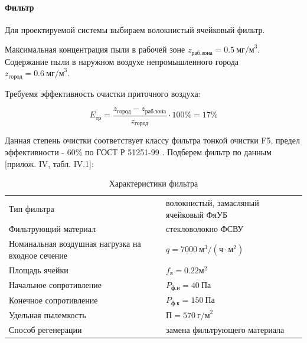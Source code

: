 \paragraph{Фильтр}
Для проектируемой системы выбираем волокнистый ячейковый фильтр.

Максимальная концентрация пыли в рабочей зоне $z_\text{раб.зона} = 0.5 ~\text{мг/м}^3$.
Содержание пыли в наружном воздухе непромышленного города $z_\text{город} = 0.6 ~\text{мг/м}^3$.

Требуемя эффективность очистки приточного воздуха:

$$
    E_\text{тр} = \frac{z_\text{город} - z_\text{раб.зона}}{z_\text{город}} \cdot 100 \% = 17 \%
$$

Данная степень очистки соответствует классу фильтра тонкой очистки F5, предел
эффективности - 60\% по ГОСТ Р 51251-99 \cite{ecology_gost_51251_99}.
Подберем фильтр по данным \cite{air_ventilation_and_conditioning}[прилож. IV, табл. IV.1]:

\begin{table}[ht]
    \centering
    \begin{tabu}{X[l,m]|X[l,m]}
        \hline
        Тип фильтра                                         & волокнистый, замасляный ячейковый ФяУБ            \\
        Фильтрующий материал                                & стекловолокно ФСВУ                                \\
        Номинальная воздушная нагрузка на входное сечение   & $q = 7000 ~\text{м}^3/(\text{ч} \cdot \text{м}^2)$\\
        Площадь ячейки                                      & $f_\text{я} = 0.22 \text{м}^2 $                   \\
        Начальное сопротивление                             & $P_\text{ф.н} = 40 ~\text{Па}$                    \\
        Конечное сопротивление                              & $P_\text{ф.к} = 150 ~\text{Па}$                   \\
        Удельная пылемкость                                 & $\text{П} = 570 ~\text{г/м}^2$                    \\
        Способ регенерации                                  & замена фильтрующего материала                     \\
        \hline
    \end{tabu}
    \caption{Характеристики фильтра}
\end{table}

